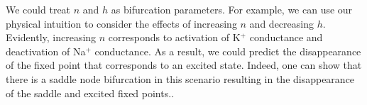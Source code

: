 \documentclass[12]{book}
\newcommand\0{\mathbf{0}}
\newcommand\<{\langle}
\renewcommand\>{\rangle}
\begin{document}
We could treat $n$ and $h$ as bifurcation parameters. For example, we can use our physical intuition to consider the effects of increasing $n$ and decreasing $h$. Evidently, increasing $n$ corresponds to activation of K$^+$ conductance and deactivation of Na$^+$ conductance. As a result, we could predict the disappearance of the fixed point that corresponds to an excited state. Indeed, one can show that there is a saddle node bifurcation in this scenario resulting in the disappearance of the saddle and excited fixed points.\cite{keener}.



\nocite{*}
\end{document}
